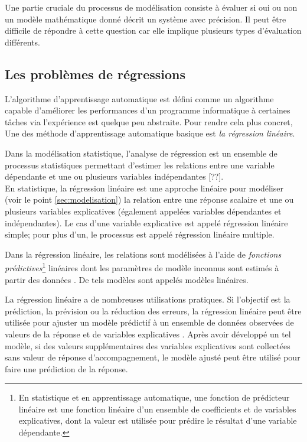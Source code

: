 	
	Une partie cruciale du processus de modélisation consiste à évaluer si oui ou non un modèle mathématique donné décrit un système avec précision. Il peut être difficile de répondre à cette question car elle implique plusieurs types d'évaluation différents.
	
	

	\subsection{Les problèmes de régressions} \label{sec:regression_problem}
	
	L'algorithme d'apprentissage automatique est défini comme un algorithme capable d'améliorer les performances d'un programme informatique à certaines tâches via l'expérience est quelque peu abstraite. Pour rendre cela plus concret, Une des méthode d'apprentissage automatique basique est \emph{la régression linéaire}\cite{goodfellow2016deep}.
	
	Dans la modélisation statistique, l'analyse de régression est un ensemble de processus statistiques permettant d'estimer les relations entre une variable dépendante et une ou plusieurs variables indépendantes [??].\\
	En statistique, la régression linéaire est une approche linéaire pour modéliser (voir le point \ref{sec:modelisation}) la relation entre une réponse scalaire et une ou plusieurs variables explicatives (également appelées variables dépendantes et indépendantes). Le cas d'une variable explicative est appelé régression linéaire simple; pour plus d'un, le processus est appelé régression linéaire multiple.
	
	Dans la régression linéaire, les relations sont modélisées à l'aide de \textit{fonctions prédictives}\footnote{En statistique et en apprentissage automatique, une fonction de prédicteur linéaire est une fonction linéaire d'un ensemble de coefficients et de variables explicatives, dont la valeur est utilisée pour prédire le résultat d'une variable dépendante.} linéaires dont les paramètres de modèle inconnus sont estimés à partir des données \cite{matloff2017statistical}. De tels modèles sont appelés modèles linéaires.
	
	La régression linéaire a de nombreuses utilisations pratiques. Si l'objectif est la prédiction, la prévision ou la réduction des erreurs, la régression linéaire peut être utilisée pour ajuster un modèle prédictif à un ensemble de données observées de valeurs de la réponse et de variables explicatives \cite{darlington2016regression}. Après avoir développé un tel modèle, si des valeurs supplémentaires des variables explicatives sont collectées sans valeur de réponse d'accompagnement, le modèle ajusté peut être utilisé pour faire une prédiction de la réponse.
	
